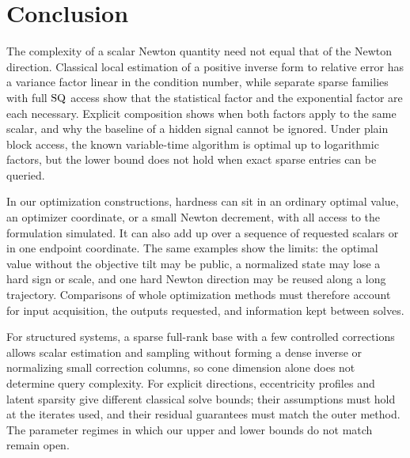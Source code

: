 \section{Conclusion}\label{sec:conclusion}
The complexity of a scalar Newton quantity need not equal that of the
Newton direction. Classical local estimation of a positive inverse form
to relative error has a variance factor linear in the condition number,
while separate sparse families with full $\mathrm{SQ}$ access show that the
statistical factor and the exponential factor are each necessary.
Explicit composition shows when both factors apply to the same scalar, and why the baseline of a
hidden signal cannot be ignored. Under plain block access, the known
variable-time algorithm is optimal up to logarithmic factors, but the
lower bound does not hold when exact sparse entries can be queried.

In our optimization constructions, hardness can sit in an ordinary optimal value, an optimizer coordinate,
or a small Newton decrement, with all access to the formulation
simulated. It can also add up over a sequence of requested scalars or in
one endpoint coordinate. The same examples show the limits: the optimal
value without the objective tilt may be public, a normalized state may
lose a hard sign or scale, and one hard Newton direction may be reused
along a long trajectory. Comparisons of whole optimization methods must
therefore account for input acquisition, the outputs requested, and
information kept between solves.

For structured systems, a sparse full-rank
base with a few controlled corrections allows scalar estimation and
sampling without forming a dense inverse or normalizing small correction
columns, so cone dimension alone does not determine query complexity.
For explicit directions, eccentricity profiles and latent sparsity give
different classical solve bounds; their assumptions must hold at the
iterates used, and their residual guarantees must match the
outer method. The parameter regimes in which our upper and lower bounds
do not match remain open.
